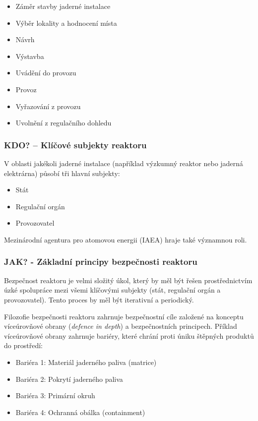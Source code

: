\begin{itemize}
    \item Záměr stavby jaderné instalace
    \item Výběr lokality a hodnocení místa
    \item Návrh
    \item Výstavba
    \item Uvádění do provozu
    \item Provoz
    \item Vyřazování z provozu
    \item Uvolnění z regulačního dohledu
\end{itemize}

\subsubsection*{KDO? -- Klíčové subjekty reaktoru}

V oblasti jakékoli jaderné instalace (například výzkumný reaktor nebo jaderná elektrárna) působí tři hlavní subjekty:

\begin{itemize}
    \item Stát
    \item Regulační orgán
    \item Provozovatel
\end{itemize}

Mezinárodní agentura pro atomovou energii (IAEA) hraje také významnou roli.

\subsubsection*{JAK? - Základní principy bezpečnosti reaktoru}

Bezpečnost reaktoru je velmi složitý úkol, který by měl být řešen prostřednictvím úzké spolupráce mezi všemi klíčovými subjekty (stát, regulační orgán a provozovatel). Tento proces by měl být iterativní a periodický.

Filozofie bezpečnosti reaktoru zahrnuje bezpečnostní cíle založené na konceptu víceúrovňové obrany (\textit{defence in depth}) a bezpečnostních principech. Příklad víceúrovňové obrany zahrnuje bariéry, které chrání proti úniku štěpných produktů do prostředí:

\begin{itemize}
    \item Bariéra 1: Materiál jaderného paliva (matrice)
    \item Bariéra 2: Pokrytí jaderného paliva
    \item Bariéra 3: Primární okruh
    \item Bariéra 4: Ochranná obálka (containment)
\end{itemize}

